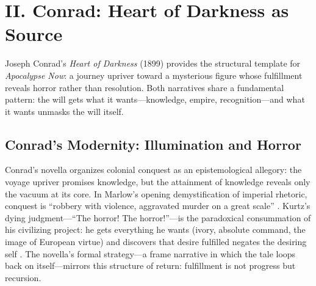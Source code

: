 \section*{II. Conrad: Heart of Darkness as Source}
\label{sec:ii-conrad}

Joseph Conrad's \textit{Heart of Darkness} (1899) provides the structural template for 
\textit{Apocalypse Now}: a journey upriver toward a mysterious figure whose fulfillment reveals 
horror rather than resolution. Both narratives share a fundamental pattern: the will gets what 
it wants---knowledge, empire, recognition---and what it wants unmasks the will itself.

\subsection*{Conrad's Modernity: Illumination and Horror}
\label{ssec:conrad-s-modernity-illumination-and-horror}
Conrad’s novella organizes colonial conquest as an epistemological allegory: the voyage upriver promises knowledge, but the attainment of knowledge reveals only the vacuum at its core. In Marlow’s opening demystification of imperial rhetoric, conquest is ``robbery with violence, aggravated murder on a great scale'' \parencite[ConradHOD1990]{ConradHOD1990}. Kurtz’s dying judgment---``The horror! The horror!''---is the paradoxical consummation of his civilizing project: he gets everything he wants (ivory, absolute command, the image of European virtue) and discovers that desire fulfilled negates the desiring self \parencite{ConradHOD1990}. The novella’s formal strategy---a frame narrative in which the tale loops back on itself---mirrors this structure of return: fulfillment is not progress but recursion.
